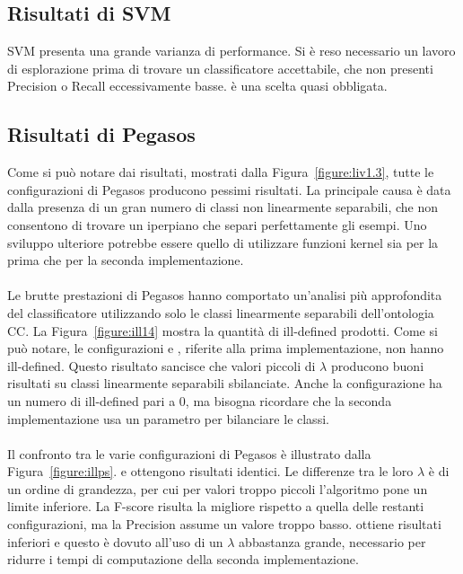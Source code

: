 \documentclass[12pt,a4paper,oneside,hidelinks]{report}
\begin{document}
\subsection{Risultati di SVM}
SVM presenta una grande varianza di performance. Si è reso necessario un lavoro di esplorazione prima di trovare un classificatore accettabile, che non presenti Precision o Recall eccessivamente basse.  è una scelta quasi obbligata.

\subsection{Risultati di Pegasos}
Come si può notare dai risultati, mostrati dalla Figura~\ref{figure:liv1.3}, tutte le configurazioni di Pegasos producono pessimi risultati. La principale causa è data dalla presenza di un gran numero di classi non linearmente separabili, che non consentono di trovare un iperpiano che separi perfettamente gli esempi. Uno sviluppo ulteriore potrebbe essere quello di utilizzare funzioni kernel sia per la prima che per la seconda implementazione.

\paragraph*{}
Le brutte prestazioni di Pegasos hanno comportato un'analisi più approfondita del classificatore utilizzando solo le classi linearmente separabili dell'ontologia CC.
La Figura~\ref{figure:ill14} mostra la quantità di ill-defined prodotti. Come si può notare, le configurazioni  e , riferite alla prima implementazione, non hanno ill-defined. Questo risultato sancisce che valori piccoli di $\lambda$ producono buoni risultati su classi linearmente separabili sbilanciate. Anche la configurazione  ha un numero di ill-defined pari a 0, ma bisogna ricordare che la seconda implementazione usa un parametro per bilanciare le classi.

\paragraph*{}
Il confronto tra le varie configurazioni di Pegasos è illustrato dalla Figura~\ref{figure:illps}.  e  ottengono risultati identici. Le differenze tra le loro $\lambda$ è di un ordine di grandezza, per cui per valori troppo piccoli l'algoritmo pone un limite inferiore. La F-score risulta la migliore rispetto a quella delle restanti configurazioni, ma la Precision assume un valore troppo basso.  ottiene risultati inferiori e questo è dovuto all'uso di un $\lambda$ abbastanza grande, necessario per ridurre i tempi di computazione della seconda implementazione.  
\end{document}
